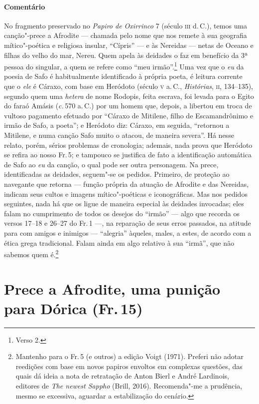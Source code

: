 {\paragraph{Comentário} No fragmento preservado no \emph{Papiro de Oxirrinco} 7 (século \textsc{iii} d.\,C.),
temos uma canção"-prece a Afrodite --- chamada pelo nome que nos remete à sua
geografia mítico"-poética e religiosa insular, ``Cípris'' --- e às Nereidas
--- netas de Oceano e filhas do velho do mar, Nereu. Quem apela às deidades o faz
em benefício da 3ª pessoa do singular, a quem se refere como ``meu
irmão''.\footnote{Verso 2.} Uma vez que o \emph{eu} da poesia de Safo é habitualmente
identificado à própria poeta, é leitura corrente que o \emph{ele} é Cáraxo, com base
em Heródoto (século \textsc{v} a.\,C., \emph{Histórias}, \textsc{ii}, 134--135), segundo quem uma
\emph{hetera} de nome Rodopis, feita escrava, foi levada para o Egito do faraó Amásis
(\emph{c.}\,570 a.\,C.) por um homem que, depois, a libertou em troca de vultoso
pagamento efetuado por ``Cáraxo de Mitilene, filho de Escamandrônimo e
irmão de Safo, a poeta''; e Heródoto diz: Cáraxo, em seguida, ``retornou
a Mitilene, e numa canção Safo muito o atacou, de maneira severa''. Há nesse
relato, porém, sérios problemas de cronologia; ademais, nada prova que Heródoto se refira ao
nosso Fr.\,5; e tampouco se justifica de fato a identificação automática de
Safo ao \emph{eu} da canção, o qual pode ser outra personagem.
Na prece, identificadas as deidades, seguem"-se os
pedidos. Primeiro, de proteção ao navegante que retorna --- função própria da
atuação de Afrodite e das Nereidas, indicam seus cultos e imagens
mítico"-poéticas e iconográficas. Mas nos pedidos seguintes, nada há que os
ligue de maneira especial às deidades invocadas; eles falam no
cumprimento de todos os desejos do ``irmão'' --- algo que recorda os
versos 17--18 e 26--27 do Fr.\,1 ---, na reparação de seus erros passados, na
atitude para com amigos e inimigos --- ``alegria'' àqueles,
males, a estes, de acordo com a ética grega tradicional. Falam ainda em algo
relativo à sua ``irmã'', que não sabemos quem é.\footnote{Mantenho para o Fr.\,5 (e outros) a edição Voigt (1971). Preferi não adotar reedições com base em novos papiros envoltos em complexas questões, das quais dá ideia a nota de retratação de Anton Bierl e André Lardinois, editores de \emph{The newest Sappho} (Brill, 2016). Recomenda"-me a prudência, mesmo se excessiva, aguardar a estabilização do cenário.}}



\section[Prece a Afrodite, uma punição para Dórica (Fr.\,15)]{Prece a Afrodite, uma punição\\para Dórica (Fr.\,15)}

